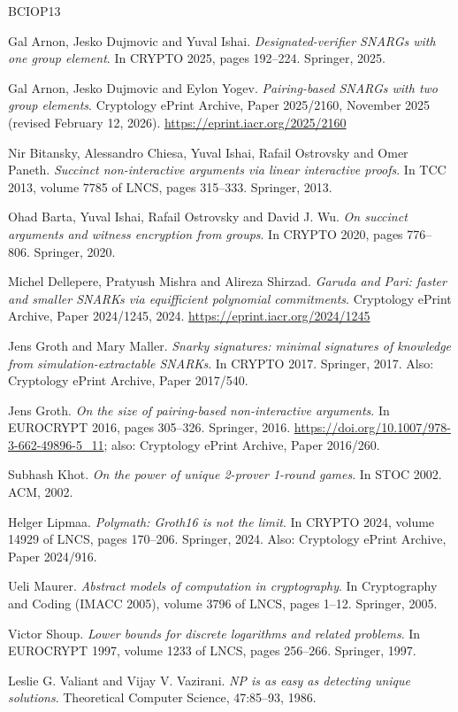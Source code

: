 \documentclass{aicr-conjecture}
\begin{document}
\begin{aicrbibliography}{BCIOP13}

Gal Arnon, Jesko Dujmovic and Yuval Ishai.
\emph{Designated-verifier SNARGs with one group element}.
In CRYPTO 2025, pages 192--224. Springer, 2025.

Gal Arnon, Jesko Dujmovic and Eylon Yogev.
\emph{Pairing-based SNARGs with two group elements}.
Cryptology ePrint Archive, Paper 2025/2160, November 2025 (revised
February 12, 2026).
\url{https://eprint.iacr.org/2025/2160}

Nir Bitansky, Alessandro Chiesa, Yuval Ishai, Rafail Ostrovsky and
Omer Paneth.
\emph{Succinct non-interactive arguments via linear interactive
proofs}.
In TCC 2013, volume 7785 of LNCS, pages 315--333. Springer, 2013.

Ohad Barta, Yuval Ishai, Rafail Ostrovsky and David J. Wu.
\emph{On succinct arguments and witness encryption from groups}.
In CRYPTO 2020, pages 776--806. Springer, 2020.

Michel Dellepere, Pratyush Mishra and Alireza Shirzad.
\emph{Garuda and Pari: faster and smaller SNARKs via equifficient
polynomial commitments}.
Cryptology ePrint Archive, Paper 2024/1245, 2024.
\url{https://eprint.iacr.org/2024/1245}

Jens Groth and Mary Maller.
\emph{Snarky signatures: minimal signatures of knowledge from
simulation-extractable SNARKs}.
In CRYPTO 2017. Springer, 2017.
Also: Cryptology ePrint Archive, Paper 2017/540.

Jens Groth.
\emph{On the size of pairing-based non-interactive arguments}.
In EUROCRYPT 2016, pages 305--326. Springer, 2016.
\url{https://doi.org/10.1007/978-3-662-49896-5_11};
also: Cryptology ePrint Archive, Paper 2016/260.

Subhash Khot.
\emph{On the power of unique 2-prover 1-round games}.
In STOC 2002. ACM, 2002.

Helger Lipmaa.
\emph{Polymath: Groth16 is not the limit}.
In CRYPTO 2024, volume 14929 of LNCS, pages 170--206. Springer,
2024.
Also: Cryptology ePrint Archive, Paper 2024/916.

Ueli Maurer.
\emph{Abstract models of computation in cryptography}.
In Cryptography and Coding (IMACC 2005), volume 3796 of LNCS,
pages 1--12. Springer, 2005.

Victor Shoup.
\emph{Lower bounds for discrete logarithms and related problems}.
In EUROCRYPT 1997, volume 1233 of LNCS, pages 256--266.
Springer, 1997.

Leslie G. Valiant and Vijay V. Vazirani.
\emph{NP is as easy as detecting unique solutions}.
Theoretical Computer Science, 47:85--93, 1986.

\end{aicrbibliography}
\end{document}
